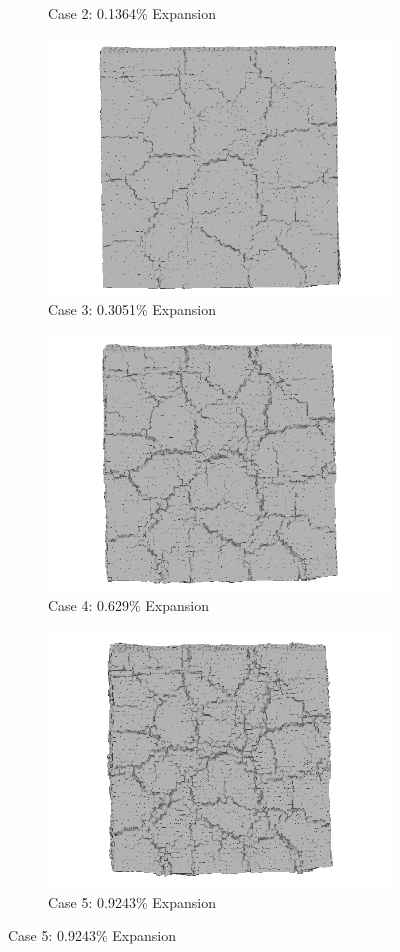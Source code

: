\begin{figure}[!h]
\begin{subfigure}{.5\textwidth}
    \caption{Case 2: 0.1364\% Expansion}
    \end{subfigure}%
    \begin{subfigure}{.5\textwidth}
      \centering
      \includegraphics[width=.8\linewidth]{Files/exp_3D/ASR/A15P75_3_3ds.png}
    \caption{Case 3: 0.3051\% Expansion}
    \end{subfigure}
    \begin{subfigure}{.5\textwidth}
      \centering
      \includegraphics[width=.8\linewidth]{Files/exp_3D/ASR/A15P75_4_3ds.png}
    \caption{Case 4: 0.629\% Expansion}
    \end{subfigure}%
    \begin{subfigure}{.5\textwidth}
      \centering
      \includegraphics[width=.8\linewidth]{Files/exp_3D/ASR/A15P75_5_3ds.png}
    \caption{Case 5: 0.9243\% Expansion}
    \end{subfigure}


\end{figure}
